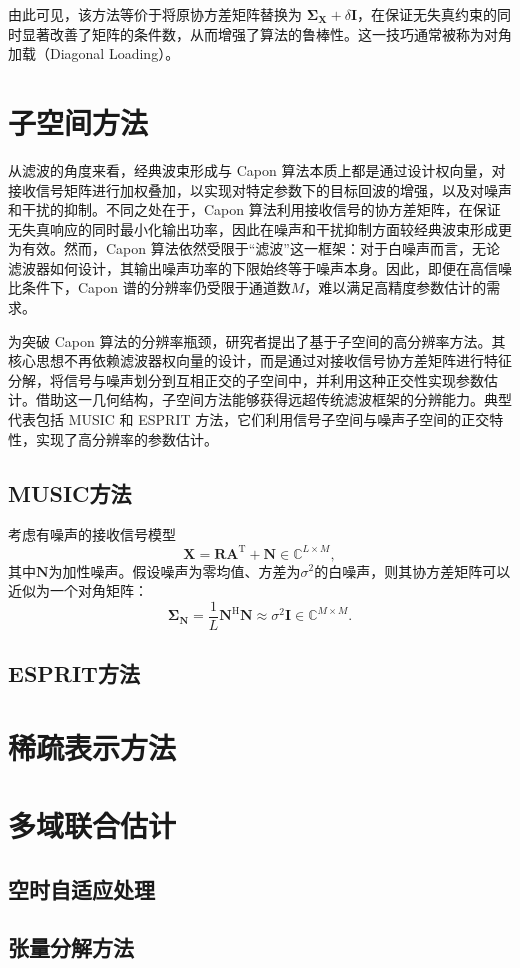 由此可见，该方法等价于将原协方差矩阵替换为 \(\mathbf{\Sigma}_{\mathbf{X}} + \delta \mathbf{I}\)，在保证无失真约束的同时显著改善了矩阵的条件数，从而增强了算法的鲁棒性。这一技巧通常被称为对角加载（Diagonal Loading）。

\section{子空间方法}
从滤波的角度来看，经典波束形成与 Capon 算法本质上都是通过设计权向量，对接收信号矩阵进行加权叠加，以实现对特定参数下的目标回波的增强，以及对噪声和干扰的抑制。不同之处在于，Capon 算法利用接收信号的协方差矩阵，在保证无失真响应的同时最小化输出功率，因此在噪声和干扰抑制方面较经典波束形成更为有效。然而，Capon 算法依然受限于“滤波”这一框架：对于白噪声而言，无论滤波器如何设计，其输出噪声功率的下限始终等于噪声本身。因此，即便在高信噪比条件下，Capon 谱的分辨率仍受限于通道数\( M \)，难以满足高精度参数估计的需求。

为突破 Capon 算法的分辨率瓶颈，研究者提出了基于子空间的高分辨率方法。其核心思想不再依赖滤波器权向量的设计，而是通过对接收信号协方差矩阵进行特征分解，将信号与噪声划分到互相正交的子空间中，并利用这种正交性实现参数估计。借助这一几何结构，子空间方法能够获得远超传统滤波框架的分辨能力。典型代表包括 MUSIC 和 ESPRIT 方法，它们利用信号子空间与噪声子空间的正交特性，实现了高分辨率的参数估计。

\subsection{MUSIC方法}
考虑有噪声的接收信号模型
\[
    \mathbf{X} = \mathbf{R} \mathbf{A}^{\mathrm{T}} + \mathbf{N} \in \mathbb{C}^{L \times M},
\]
其中\( \mathbf{N} \)为加性噪声。假设噪声为零均值、方差为\( \sigma^2 \)的白噪声，则其协方差矩阵可以近似为一个对角矩阵：
\[
    \mathbf{\Sigma}_{\mathbf{N}} = \frac{1}{L} \mathbf{N}^{\mathrm{H}} \mathbf{N} \approx \sigma^2 \mathbf{I} \in \mathbb{C}^{M \times M}.
\]



\subsection{ESPRIT方法}

\section{稀疏表示方法}

\section{多域联合估计}

\subsection{空时自适应处理}

\subsection{张量分解方法}
